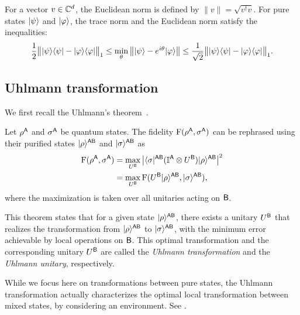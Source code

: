 For a vector $v \in \mathbb{C}^d$, the Euclidean norm is defined by $\|v\| =\sqrt{v^\dag v}$. For pure states $|\psi\rangle$ and $|\varphi\rangle$, the trace norm and the Euclidean norm satisfy the inequalities:
\begin{align}
\label{eq:relation of Euclidean and trace norm}
    \frac{1}{2}\big\||\psi\rangle\langle\psi| - |\varphi\rangle\langle\varphi|\big\|_1 
    \leq \min_\theta\big\||\psi\rangle - e^{i\theta}|\varphi\rangle\big\| \leq \frac{1}{\sqrt{2}}\big\||\psi\rangle\langle\psi| - |\varphi\rangle\langle\varphi|\big\|_1.
\end{align}





\subsection{Uhlmann transformation}
\label{sec:uhl intro}

We first recall the Uhlmann's theorem~\cite{uhlmann1976transition}.
\begin{theorem}
\label{thm:Uhlmann theorem}
    Let $\rho^{\mathsf{A}}$ and $\sigma^{\mathsf{A}}$ be quantum states. The fidelity ${\mathrm{F}}(\rho^{\mathsf{A}}, \sigma^{\mathsf{A}})$ can be rephrased using their purified states $|\rho\rangle^{{\mathsf{A}}{\mathsf{B}}}$ and $|\sigma\rangle^{{\mathsf{A}}{\mathsf{B}}}$ as
\begin{align}
    {\mathrm{F}}(\rho^{\mathsf{A}}, \sigma^{\mathsf{A}}) 
    &= \max_{U^{\mathsf{B}}}\big| \langle\sigma|^{{\mathsf{A}}{\mathsf{B}}}(\mathbb{I}^{\mathsf{A}} \otimes U^{{\mathsf{B}}})|\rho\rangle^{{\mathsf{A}}{\mathsf{B}}} \big|^2 \\
    &= \max_{U^{\mathsf{B}}}{\mathrm{F}}(U^{\mathsf{B}} |\rho\rangle^{{\mathsf{A}}{\mathsf{B}}}, |\sigma\rangle^{{\mathsf{A}}{\mathsf{B}}}),
\end{align}
where the maximization is taken over all unitaries acting on ${\mathsf{B}}$.
\end{theorem}
This theorem states that for a given state $|\rho\rangle^{{\mathsf{A}}{\mathsf{B}}}$, there exists a unitary $U^{\mathsf{B}}$ that realizes the transformation from $|\rho\rangle^{{\mathsf{A}}{\mathsf{B}}}$ to $|\sigma\rangle^{{\mathsf{A}}{\mathsf{B}}}$, with the minimum error achievable by local operations on ${\mathsf{B}}$.
This optimal transformation and the corresponding unitary $U^{\mathsf{B}}$ are called the \emph{Uhlmann transformation} and the \emph{Uhlmann unitary}, respectively.


While we focus here on transformations between pure states, the Uhlmann transformation actually characterizes the optimal local transformation between mixed states, by considering an environment. See .


